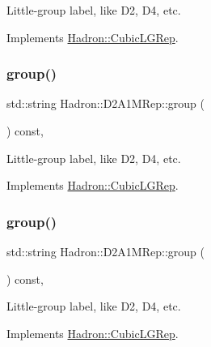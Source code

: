 Little-\/group label, like D2, D4, etc. 

Implements \mbox{\hyperlink{structHadron_1_1CubicLGRep_a9bdb14b519a611d21379ed96a3a9eb41}{Hadron\+::\+Cubic\+L\+G\+Rep}}.

\mbox{\label{structHadron_1_1D2A1MRep_a8d1ad4d399b153870478b6e636ee0131}} 
\subsubsection{\texorpdfstring{group()}{group()}\hspace{0.1cm}{\footnotesize\ttfamily [2/3]}}
{\footnotesize\ttfamily std\+::string Hadron\+::\+D2\+A1\+M\+Rep\+::group (\begin{DoxyParamCaption}{ }\end{DoxyParamCaption}) const\hspace{0.3cm}{\ttfamily [inline]}, {\ttfamily [virtual]}}

Little-\/group label, like D2, D4, etc. 

Implements \mbox{\hyperlink{structHadron_1_1CubicLGRep_a9bdb14b519a611d21379ed96a3a9eb41}{Hadron\+::\+Cubic\+L\+G\+Rep}}.

\mbox{\label{structHadron_1_1D2A1MRep_a8d1ad4d399b153870478b6e636ee0131}} 
\subsubsection{\texorpdfstring{group()}{group()}\hspace{0.1cm}{\footnotesize\ttfamily [3/3]}}
{\footnotesize\ttfamily std\+::string Hadron\+::\+D2\+A1\+M\+Rep\+::group (\begin{DoxyParamCaption}{ }\end{DoxyParamCaption}) const\hspace{0.3cm}{\ttfamily [inline]}, {\ttfamily [virtual]}}

Little-\/group label, like D2, D4, etc. 

Implements \mbox{\hyperlink{structHadron_1_1CubicLGRep_a9bdb14b519a611d21379ed96a3a9eb41}{Hadron\+::\+Cubic\+L\+G\+Rep}}.

\mbox{\label{structHadron_1_1D2A1MRep_ae86f915110783280c85121414a31e18f}} 
